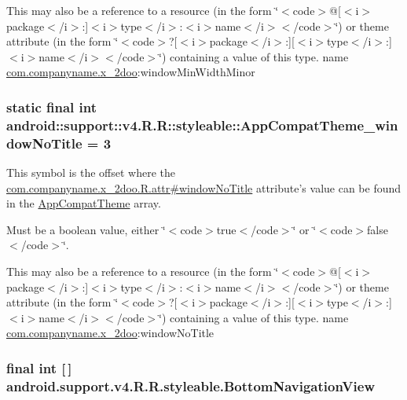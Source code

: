 This may also be a reference to a resource (in the form \char`\"{}$<$code$>$@\mbox{[}$<$i$>$package$<$/i$>$:\mbox{]}$<$i$>$type$<$/i$>$:$<$i$>$name$<$/i$>$$<$/code$>$\char`\"{}) or theme attribute (in the form \char`\"{}$<$code$>$?\mbox{[}$<$i$>$package$<$/i$>$:\mbox{]}\mbox{[}$<$i$>$type$<$/i$>$:\mbox{]}$<$i$>$name$<$/i$>$$<$/code$>$\char`\"{}) containing a value of this type.  name \hyperlink{namespacecom_1_1companyname_1_1x__2doo}{com.companyname.x\_\-2doo}:windowMinWidthMinor \hypertarget{classandroid_1_1support_1_1v4_1_1_r_1_1styleable_8b1c22084adcad0c0271c952798a1a61}{
\subsubsection[{AppCompatTheme\_\-windowNoTitle}]{\setlength{\rightskip}{0pt plus 5cm}static final int android::support::v4.R.R::styleable::AppCompatTheme\_\-windowNoTitle = 3}}
\label{classandroid_1_1support_1_1v4_1_1_r_1_1styleable_8b1c22084adcad0c0271c952798a1a61}


This symbol is the offset where the \hyperlink{classcom_1_1companyname_1_1x__2doo_1_1_r_1_1attr_bbdf5a40d5bc7d26b3742026ca6ce14c}{com.companyname.x\_\-2doo.R.attr\#windowNoTitle} attribute's value can be found in the \hyperlink{classandroid_1_1support_1_1v4_1_1_r_1_1styleable_0873e92ba21076bb5a4aeadeb7f5779f}{AppCompatTheme} array.

Must be a boolean value, either \char`\"{}$<$code$>$true$<$/code$>$\char`\"{} or \char`\"{}$<$code$>$false$<$/code$>$\char`\"{}. 

This may also be a reference to a resource (in the form \char`\"{}$<$code$>$@\mbox{[}$<$i$>$package$<$/i$>$:\mbox{]}$<$i$>$type$<$/i$>$:$<$i$>$name$<$/i$>$$<$/code$>$\char`\"{}) or theme attribute (in the form \char`\"{}$<$code$>$?\mbox{[}$<$i$>$package$<$/i$>$:\mbox{]}\mbox{[}$<$i$>$type$<$/i$>$:\mbox{]}$<$i$>$name$<$/i$>$$<$/code$>$\char`\"{}) containing a value of this type.  name \hyperlink{namespacecom_1_1companyname_1_1x__2doo}{com.companyname.x\_\-2doo}:windowNoTitle \hypertarget{classandroid_1_1support_1_1v4_1_1_r_1_1styleable_731fa193e6e8634aff724fecf9d4f640}{
\subsubsection[{BottomNavigationView}]{\setlength{\rightskip}{0pt plus 5cm}final int \mbox{[}$\,$\mbox{]} android.support.v4.R.R.styleable.BottomNavigationView}}
\label{classandroid_1_1support_1_1v4_1_1_r_1_1styleable_731fa193e6e8634aff724fecf9d4f640}



